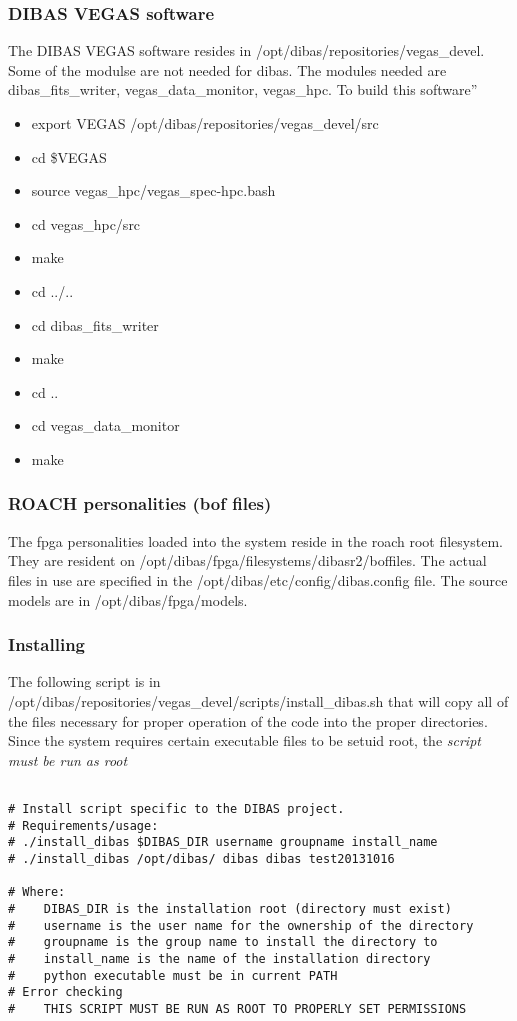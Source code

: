 \documentclass[11pt]{article}
\begin{document}
\subsubsection{DIBAS VEGAS software}
The DIBAS VEGAS software resides in
/opt/dibas/repositories/vegas\_devel.  Some of the modulse are not
needed for dibas.  The modules needed are dibas\_fits\_writer,
vegas\_data\_monitor, vegas\_hpc.  To build this software''
\begin{itemize}
\item export VEGAS /opt/dibas/repositories/vegas\_devel/src
\item cd \$VEGAS
\item source vegas\_hpc/vegas\_spec-hpc.bash
\item cd vegas\_hpc/src
\item make
\item cd ../..
\item cd dibas\_fits\_writer
\item make
\item cd ..
\item cd vegas\_data\_monitor
\item make
\end{itemize}

\subsubsection{ROACH personalities (bof files)}
The fpga personalities loaded into the system reside in the roach root
filesystem.  They are resident on
/opt/dibas/fpga/filesystems/dibasr2/boffiles.  The actual files in use
are specified in the /opt/dibas/etc/config/dibas.config file.  The
source models are in /opt/dibas/fpga/models.

\subsubsection{Installing}

The following script is in
/opt/dibas/repositories/vegas\_devel/scripts/install\_dibas.sh that
will copy all of the files necessary for proper operation of the code
into the proper directories.  Since the system requires certain
executable files to be setuid root, the \emph{ script must be run as
  root }

\begin{verbatim}

# Install script specific to the DIBAS project.
# Requirements/usage:
# ./install_dibas $DIBAS_DIR username groupname install_name
# ./install_dibas /opt/dibas/ dibas dibas test20131016

# Where:
#    DIBAS_DIR is the installation root (directory must exist)
#    username is the user name for the ownership of the directory
#    groupname is the group name to install the directory to
#    install_name is the name of the installation directory
#    python executable must be in current PATH
# Error checking
#    THIS SCRIPT MUST BE RUN AS ROOT TO PROPERLY SET PERMISSIONS

\end{verbatim}
\end{document}
